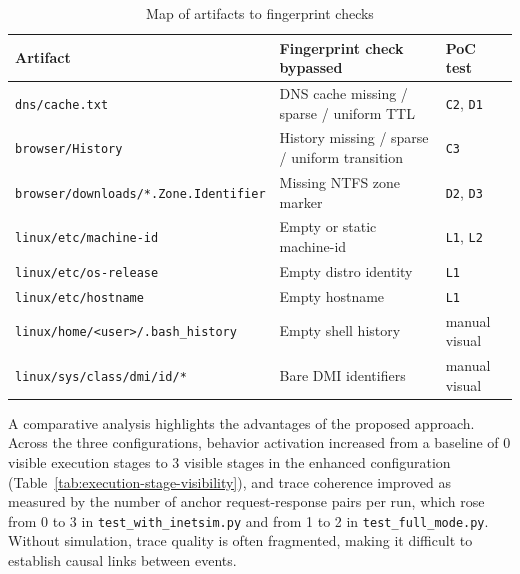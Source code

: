 \begin{table}[htbp]
\centering
\caption{Map of artifacts to fingerprint checks}
\label{tab:artifact-check-map}
\begin{tabular}{|L{0.30\textwidth}|L{0.36\textwidth}|L{0.26\textwidth}|}
\hline
\textbf{Artifact} & \textbf{Fingerprint check bypassed} & \textbf{PoC test} \\
\hline
\texttt{dns/cache.txt}                    & DNS cache missing / sparse / uniform TTL & \texttt{C2}, \texttt{D1} \\
\hline
\texttt{browser/History}                  & History missing / sparse / uniform transition & \texttt{C3} \\
\hline
\texttt{browser/downloads/*.Zone.Identifier} & Missing NTFS zone marker             & \texttt{D2}, \texttt{D3} \\
\hline
\texttt{linux/etc/machine-id}             & Empty or static machine-id                & \texttt{L1}, \texttt{L2} \\
\hline
\texttt{linux/etc/os-release}             & Empty distro identity                     & \texttt{L1} \\
\hline
\texttt{linux/etc/hostname}               & Empty hostname                            & \texttt{L1} \\
\hline
\texttt{linux/home/<user>/.bash\_history} & Empty shell history                       & manual visual \\
\hline
\texttt{linux/sys/class/dmi/id/*}         & Bare DMI identifiers                      & manual visual \\
\hline
\end{tabular}
\end{table}


A comparative analysis highlights the advantages of the proposed
approach. Across the three configurations, behavior activation increased
from a baseline of 0 visible execution stages
to 3 visible stages in the enhanced configuration
(Table~\ref{tab:execution-stage-visibility}), and trace coherence
improved as measured by the number of anchor request-response pairs
per run, which rose from 0 to 3 in \texttt{test\_with\_inetsim.py}
and from 1 to 2 in \texttt{test\_full\_mode.py}. Without simulation,
trace quality is often fragmented, making it difficult to establish
causal links between events.

